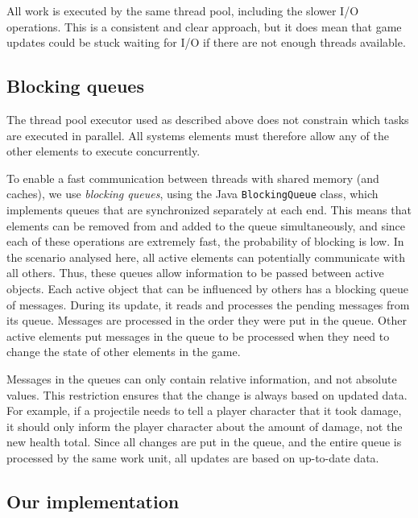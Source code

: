 All work is executed by the same thread pool, including the slower I/O operations. This is a consistent and clear approach, but it does mean that game updates could be stuck waiting for I/O if there are not enough threads available. 

\subsection{Blocking queues}

The thread pool executor used as described above does not constrain
which tasks are executed in parallel. All systems elements
must therefore allow any of the other elements to execute concurrently. 

To enable a fast communication between threads with shared memory (and
caches), we use \textit{blocking queues}, using the Java
\texttt{Blocking\-Queue} class, which implements queues that are
synchronized separately at each end. This means that elements can be
removed from and added to the queue simultaneously, and since each of
these operations are extremely fast, the probability of blocking is
low. In the scenario analysed here, all active elements can potentially communicate with all others.
%
Thus, these queues allow information to be passed
between active objects. Each active object that can be influenced by
others has a blocking queue of messages. During its update, it  reads and processes
the pending messages from its queue. Messages are processed in the order they were put in the queue. Other active
elements put messages in the queue to be processed when they need to
change the state of other elements in the game.

Messages in the queues can only contain relative information, and not absolute values. This restriction ensures that the change is always based on updated data. For example, if a projectile needs to tell a player character that it took damage, it should only inform the player character about the amount of damage, not the new health total. Since all changes are put in the queue, and the entire queue is processed by the same work unit, all updates are based on up-to-date data.
\subsection{Our implementation}
 
